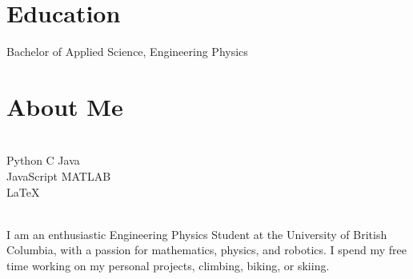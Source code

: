 \documentclass[]{deedy-resume-openfont}
\begin{document}
\section{Education}
\begin{tightemize}
	\item Bachelor of Applied Science, Engineering Physics \\
\end{tightemize}
\vspace{8pt}

\section{About Me}
\begin{minipage}[t]{.35\textwidth}
	 \\
	Python \textbullet{} C \textbullet{} Java \\
	JavaScript \textbullet{} MATLAB \\
	\LaTeX
	\vspace{8pt}
\end{minipage}
\hfill
\begin{minipage}[t]{.55\textwidth}
	 \\
	I am an enthusiastic Engineering Physics Student at the University of British Columbia, with a passion for mathematics, physics, and robotics. I spend my free time working on my personal projects, climbing, biking, or skiing.
\end{minipage}
\end{document}
